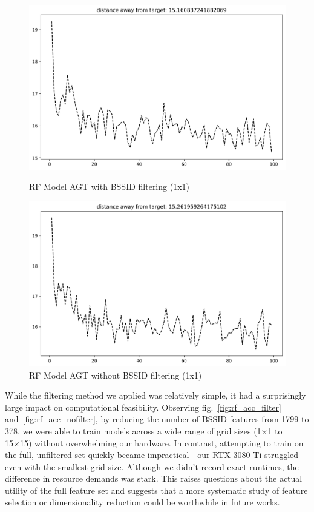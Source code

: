 \documentclass[runningheads]{llncs}
\begin{document}
\begin{figure}[hbt!]
	\begin{minipage}{0.45\textwidth}
		\centering
		\includegraphics[width=\linewidth]{image4.png}
		\caption{RF Model AGT with BSSID filtering (1x1)}
		\label{fig:rf_agt_filter}
	\end{minipage}
	\hfill
	\begin{minipage}{0.45\textwidth}
		\centering
		\includegraphics[width=\linewidth]{image7.png}
		\caption{RF Model AGT without BSSID filtering (1x1)}
		\label{fig:rf_agt_nofilter}
	\end{minipage}
\end{figure}

While the filtering method we applied was relatively simple, it had a surprisingly large impact on computational feasibility. Observing fig.~\ref{fig:rf_acc_filter} and~\ref{fig:rf_acc_nofilter}, by reducing the number of BSSID features from 1799 to 378, we were able to train models across a wide range of grid sizes (1×1 to 15×15) without overwhelming our hardware. In contrast, attempting to train on the full, unfiltered set quickly became impractical—our RTX 3080 Ti struggled even with the smallest grid size. Although we didn’t record exact runtimes, the difference in resource demands was stark. This raises questions about the actual utility of the full feature set and suggests that a more systematic study of feature selection or dimensionality reduction could be worthwhile in future works.
\end{document}

